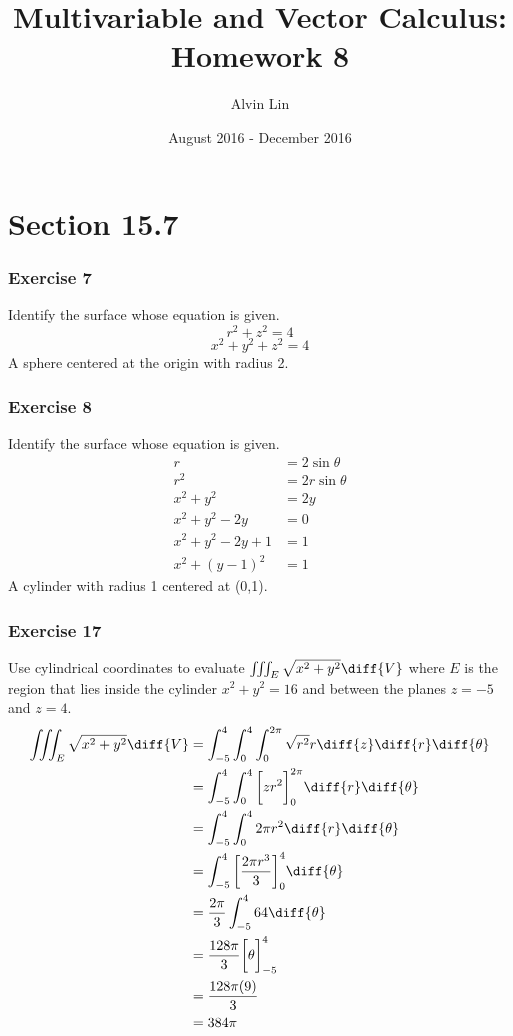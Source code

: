 \documentclass{math}
\title{Multivariable and Vector Calculus: Homework 8}
\author{Alvin Lin}
\date{August 2016 - December 2016}
\begin{document}
\maketitle

\section*{Section 15.7}

\subsubsection*{Exercise 7}
Identify the surface whose equation is given.
\[ r^2+z^2 = 4 \]
\[ x^2+y^2+z^2 = 4 \]
A sphere centered at the origin with radius 2.

\subsubsection*{Exercise 8}
Identify the surface whose equation is given.
\begin{align*}
  r &= 2\sin\theta \\
  r^2 &= 2r\sin\theta \\
  x^2+y^2 &= 2y \\
  x^2+y^2-2y &= 0 \\
  x^2+y^2-2y+1 &= 1 \\
  x^2+(y-1)^2 &= 1
\end{align*}
A cylinder with radius 1 centered at (0,1).

\subsubsection*{Exercise 17}
Use cylindrical coordinates to evaluate \( \iiint_{E}\sqrt{x^2+y^2}\diff{V} \)
where \( E \) is the region that lies inside the cylinder \( x^2+y^2 = 16 \) and
between the planes \( z = -5 \) and \( z = 4 \).
\begin{align*}
  \iiint_{E}\sqrt{x^2+y^2}\diff{V} &=
    \int_{-5}^{4}\int_{0}^{4}\int_{0}^{2\pi}\sqrt{r^2}r
    \diff{z}\diff{r}\diff{\theta} \\
  &= \int_{-5}^{4}\int_{0}^{4}\bigg[zr^2\bigg]_{0}^{2\pi}
    \diff{r}\diff{\theta} \\
  &= \int_{-5}^{4}\int_{0}^{4}2\pi r^2\diff{r}\diff{\theta} \\
  &= \int_{-5}^{4}\bigg[\frac{2\pi r^3}{3}\bigg]_{0}^{4}\diff{\theta} \\
  &= \frac{2\pi}{3}\int_{-5}^{4}64\diff{\theta} \\
  &= \frac{128\pi}{3}\bigg[\theta\bigg]_{-5}^{4} \\
  &= \frac{128\pi(9)}{3} \\
  &= 384\pi
\end{align*}
\end{document}
